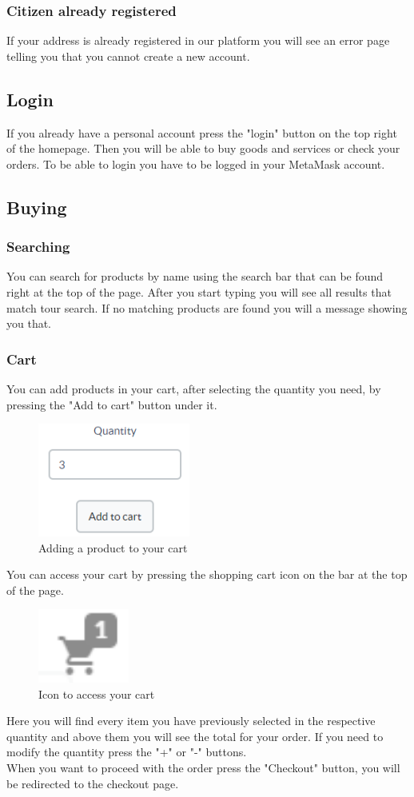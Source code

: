 	\subsubsection{Citizen already registered}
	If your address is already registered in our platform you will see an
	error page telling you that you cannot create a new account.
	\subsection{Login}
	If you already have a personal account press the "login" button on the 
	top right of the homepage. Then you will be able to buy goods and services 
	or check your orders. To be able to login you have to be logged in your 
	MetaMask account.
	\subsection{Buying}
	\subsubsection{Searching}
	You can search for products by name using the search bar that can be found 
	right at the top of the page. After you start typing you will see all 
	results that match tour search. If no matching products are found you will 
	a message showing you that.
	\subsubsection{Cart}
	You can add products in your cart, after selecting the quantity you need, 
	by pressing the "Add to cart" button under it. \\
	\begin{figure}[H]
		\includegraphics[width=5cm]{res/images/add_to_cart.png}
		\centering
		\caption{Adding a product to your cart}
	\end{figure}
	\noindent You can access your cart by pressing the shopping cart icon on the bar at 
	the top of the page.
	\begin{figure}[H]
		\includegraphics[width=3cm]{res/images/cart_icon.png}
		\centering
		\caption{Icon to access your cart}
	\end{figure}
	\noindent Here you will find every item you have previously selected in the 
	respective quantity and above them you will see the total for your order.
	If you need to modify the quantity press the "+" or "-" buttons. \\
	When you want to proceed with the order press the "Checkout" button, 
	you will be redirected to the checkout page.
